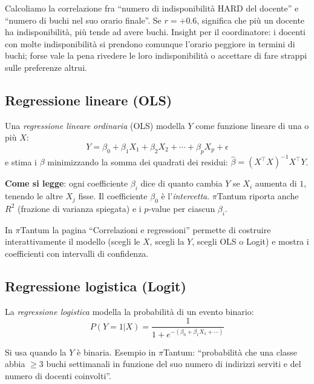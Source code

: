 \begin{esempiobox}
Calcoliamo la correlazione fra ``numero di indisponibilit\`a
HARD del docente'' e ``numero di buchi nel suo orario
finale''. Se $r = +0.6$, significa che pi\`u un docente ha
indisponibilit\`a, pi\`u tende ad avere buchi. Insight per
il coordinatore: i docenti con molte indisponibilit\`a si
prendono comunque l'orario peggiore in termini di buchi;
forse vale la pena rivedere le loro indisponibilit\`a o
accettare di fare strappi sulle preferenze altrui.
\end{esempiobox}

\subsection{Regressione lineare (OLS)}

\begin{defbox}
Una \emph{regressione lineare}
\emph{ordinaria} (OLS) modella $Y$
come funzione lineare di una o pi\`u $X$:
\[
  Y = \beta_0 + \beta_1 X_1 + \beta_2 X_2 + \cdots + \beta_p X_p + \epsilon
\]
e stima i $\beta$ minimizzando la somma dei quadrati dei
residui: $\hat{\beta} = (X^\top X)^{-1} X^\top Y$.
\end{defbox}

\textbf{Come si legge}: ogni coefficiente $\beta_i$ dice di
quanto cambia $Y$ se $X_i$ aumenta di $1$, tenendo le altre
$X_j$ fisse. Il coefficiente $\beta_0$ \`e l'\emph{intercetta}.
$\pi$Tantum riporta anche $R^2$ (frazione di varianza
spiegata) e i $p$-value per ciascun $\beta_i$.

In $\pi$Tantum la pagina ``Correlazioni e regressioni''
permette di costruire interattivamente il modello (scegli
le $X$, scegli la $Y$, scegli OLS o Logit) e mostra i
coefficienti con intervalli di confidenza.

\subsection{Regressione logistica (Logit)}

\begin{defbox}
La \emph{regressione logistica}
modella la probabilit\`a di un evento binario:
\[
  P(Y = 1 | X) = \frac{1}{1 + e^{-(\beta_0 + \beta_1 X_1 + \cdots)}}
\]
\end{defbox}

Si usa quando la $Y$ \`e binaria. Esempio in $\pi$Tantum:
``probabilit\`a che una classe abbia $\geq 3$ buchi
settimanali in funzione del suo numero di indirizzi serviti
e del numero di docenti coinvolti''.

